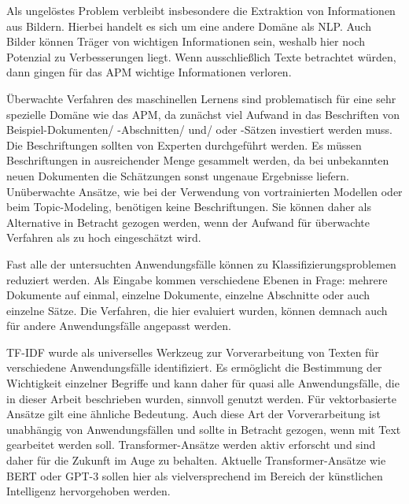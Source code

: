 Als ungelöstes Problem verbleibt insbesondere die Extraktion von Informationen aus Bildern. Hierbei handelt es sich um eine andere Domäne als NLP. Auch Bilder können Träger von wichtigen Informationen sein, weshalb hier noch Potenzial zu Verbesserungen liegt. Wenn ausschließlich Texte betrachtet würden, dann gingen für das APM wichtige Informationen verloren.

Überwachte Verfahren des maschinellen Lernens sind problematisch für eine sehr spezielle Domäne wie das APM, da zunächst viel Aufwand in das Beschriften von Beispiel-Dokumenten/ -Abschnitten/ und/ oder -Sätzen investiert werden muss. Die Beschriftungen sollten von Experten durchgeführt werden. Es müssen Beschriftungen in ausreichender Menge gesammelt werden, da bei unbekannten neuen Dokumenten die Schätzungen sonst ungenaue Ergebnisse liefern. Unüberwachte Ansätze, wie bei der Verwendung von vortrainierten Modellen oder beim Topic-Modeling, benötigen keine Beschriftungen. Sie können daher als Alternative in Betracht gezogen werden, wenn der Aufwand für überwachte Verfahren als zu hoch eingeschätzt wird. 

Fast alle der untersuchten Anwendungsfälle können zu Klassifizierungsproblemen reduziert werden. Als Eingabe kommen verschiedene Ebenen in Frage: mehrere Dokumente auf einmal, einzelne Dokumente, einzelne Abschnitte oder auch einzelne Sätze. Die Verfahren, die hier evaluiert wurden, können demnach auch für andere Anwendungsfälle angepasst werden.

TF-IDF wurde als universelles Werkzeug zur Vorverarbeitung von Texten für verschiedene Anwendungsfälle identifiziert. Es ermöglicht die Bestimmung der Wichtigkeit einzelner Begriffe und kann daher für quasi alle Anwendungsfälle, die in dieser Arbeit beschrieben wurden, sinnvoll genutzt werden. Für vektorbasierte Ansätze gilt eine ähnliche Bedeutung. Auch diese Art der Vorverarbeitung ist unabhängig von Anwendungsfällen und sollte in Betracht gezogen, wenn mit Text gearbeitet werden soll. Transformer-Ansätze werden aktiv erforscht und sind daher für die Zukunft im Auge zu behalten. 
Aktuelle Transformer-Ansätze wie BERT oder GPT-3 sollen hier als vielversprechend im Bereich der künstlichen Intelligenz hervorgehoben werden.
